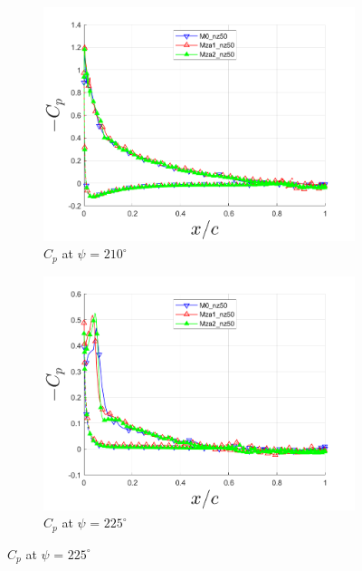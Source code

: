 \begin{figure}[H]
	\centering
	
	\begin{subfigure}[b]{0.475\textwidth}
		\centering
		\includegraphics[width=1\textwidth]{figures/zonal_adapt_results/Cp_Re200k/Cp_ph_210.png}
		\caption{ $C_p$ at $\psi$ = $210^\circ$}
		\label{fig:zonal_Cp_Re200k_210}
	\end{subfigure}
	\begin{subfigure}[b]{0.475\textwidth}
	\centering
	\includegraphics[width=1\textwidth]{figures/zonal_adapt_results/Cp_Re200k/Cp_ph_225.png}
	\caption{ $C_p$ at $\psi$ = $225^\circ$}
	\label{fig:zonal_Cp_Re200k_210}
\end{subfigure}

\end{figure}
